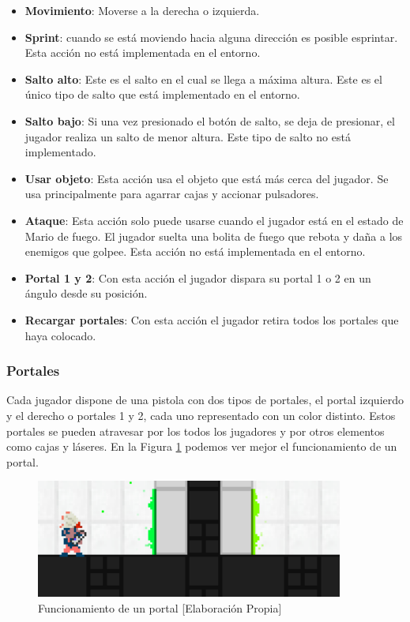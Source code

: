 \begin{itemize}
    \item \textbf{Movimiento}: Moverse a la derecha o izquierda.
    \item \textbf{Sprint}: cuando se está moviendo hacia alguna dirección es posible esprintar. Esta acción no está implementada en el entorno.
    \item \textbf{Salto alto}: Este es el salto en el cual se llega a máxima altura. Este es el único tipo de salto que está implementado en el entorno.
    \item \textbf{Salto bajo}: Si una vez presionado el botón de salto, se deja de presionar, el jugador realiza un salto de menor altura. Este tipo de salto no está implementado.
    \item \textbf{Usar objeto}: Esta acción usa el objeto que está más cerca del jugador. Se usa principalmente para agarrar cajas y accionar pulsadores.
    \item \textbf{Ataque}: Esta acción solo puede usarse cuando el jugador está en el estado de Mario de fuego. El jugador suelta una bolita de fuego que rebota y daña a los enemigos que golpee. Esta acción no está implementada en el entorno.
    \item \textbf{Portal 1 y 2}: Con esta acción el jugador dispara su portal 1 o 2 en un ángulo desde su posición.
    \item \textbf{Recargar portales}: Con esta acción el jugador retira todos los portales que haya colocado.
\end{itemize}

\subsubsection*{Portales}

Cada jugador dispone de una pistola con dos tipos de portales, el portal izquierdo y el derecho o portales 1 y 2, cada uno representado con un color distinto. Estos portales se pueden atravesar por los todos los jugadores y por otros elementos como cajas y láseres. En la Figura \ref {fig:portal} podemos ver mejor el funcionamiento de un portal.
\begin{figure}[h]
    \centering
    \includegraphics[width=0.9\textwidth]{img/portal-function.png}
    \caption{Funcionamiento de un portal [Elaboración Propia]}
    \label{fig:portal}
\end{figure}

